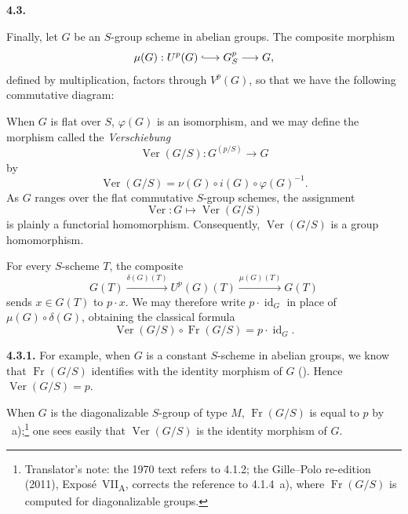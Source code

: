 
\medskip
\noindent\textbf{4.3.}
\label{sga3:VIIA:4.3}

Finally, let \(G\) be an \(S\)-group scheme in abelian groups. The
composite morphism
\[
  \mu(G):
  U^p(G)\lhook\joinrel\longrightarrow G_S^p
  \longrightarrow G,
\]
defined by multiplication, factors through \(V^p(G)\), so that we
have the following commutative diagram:
\begin{center}
  \label{sga3:VIIA:4.3-verschiebung-master-diagram}
  
\end{center}

When \(G\) is flat over \(S\), \(\varphi(G)\) is an isomorphism,
and we may define the morphism called the \emph{Verschiebung}
\[
  \operatorname{Ver}(G/S):
  G^{(p/S)}
  \longrightarrow
  G
\]
by
\[
  \operatorname{Ver}(G/S)
  =
  \nu(G)\circ i(G)\circ\varphi(G)^{-1}.
\]
As \(G\) ranges over the flat commutative \(S\)-group schemes, the
assignment
\[
  \operatorname{Ver}:G\longmapsto\operatorname{Ver}(G/S)
\]
is plainly a functorial homomorphism. Consequently,
\(\operatorname{Ver}(G/S)\) is a group homomorphism.

For every \(S\)-scheme \(T\), the composite
\[
  G(T)
  \xrightarrow{\delta(G)(T)}
  U^p(G)(T)
  \xrightarrow{\mu(G)(T)}
  G(T)
\]
sends \(x\in G(T)\) to \(p\cdot x\). We may therefore write
\(p\cdot\operatorname{id}_G\) in place of
\(\mu(G)\circ\delta(G)\), obtaining the classical formula
\[
  \tag{*}\label{sga3:vii:paragraph:4-3:equation:star}
  \operatorname{Ver}(G/S)\circ\operatorname{Fr}(G/S)
  =
  p\cdot\operatorname{id}_G.
\]

\medskip
\noindent\textbf{4.3.1.}
\label{sga3:VIIA:4.3.1}
For example, when \(G\) is a constant \(S\)-scheme in abelian groups,
we know that \(\operatorname{Fr}(G/S)\) identifies with the identity
morphism of \(G\) (). Hence \(\operatorname{Ver}(G/S)=p\).

When \(G\) is the diagonalizable \(S\)-group of type \(M\),
\(\operatorname{Fr}(G/S)\) is equal to \(p\) by ~a);\footnote{Translator's
note: the 1970 text refers to 4.1.2; the Gille--Polo re-edition (2011),
Expos\'e~VII\textsubscript{A}, corrects the reference to 4.1.4~a), where
\(\operatorname{Fr}(G/S)\) is computed for diagonalizable groups.} one sees
easily that \(\operatorname{Ver}(G/S)\) is the identity morphism of
\(G\).

